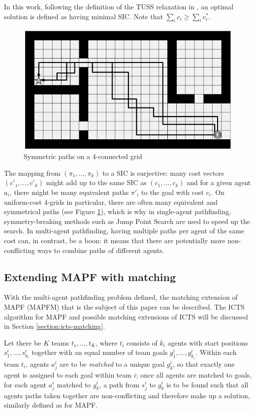 \documentclass[english,10pt]{article}
\begin{document}
	In this work, following the definition of the TUSS relaxation in \cite{mulderij2020}, an optimal solution is defined as having minimal SIC. Note that $\sum_i c_i \geq \sum_i c^*_i$.
	\begin{figure}
		\vspace{-10pt}
		\centering
		\includegraphics[width=\linewidth]{img/symmetries}
		\caption{Symmetric paths on a 4-connected grid\cite{harabor2010}}
		\label{fig:symmetries}
	\end{figure}
	The mapping from $(\pi_1,\ldots,\pi_k)$ to a SIC is surjective: many cost vectors $(c'_1,\ldots,c'_k)$ might add up to the same SIC as $(c_1,\ldots,c_k)$ and for a given agent $a_i$, there might be many equivalent paths $\pi'_i$ to the goal with cost $c_i$. On uniform-cost 4-grids in particular, there are often many equivalent and symmetrical paths\cite{harabor2010} (see Figure \ref{fig:symmetries}), which is why in single-agent pathfinding, symmetry-breaking methods such as Jump Point Search\cite{harabor2011} are used to speed up the search. In multi-agent pathfinding, having multiple paths per agent of the same cost can, in contrast, be a boon: it means that there are potentially more non-conflicting ways to combine paths of different agents.
	
	\subsection{Extending MAPF with matching}
	With the multi-agent pathfinding problem defined, the matching extension of MAPF (MAPFM) that is the subject of this paper can be described. The ICTS algorithm for MAPF and possible matching extensions of ICTS will be discussed in Section \ref{section:icts-matching}.
	
	Let there be $K$ teams $t_1,\ldots, t_K$, where $t_i$ consists of $k_i$ agents with start positions $s_1^i,\ldots,s_{k_i}^i$ together with an equal number of team goals $g_1^i,\ldots,g_{k_i}^i$. Within each team $t_i$, agents $a_j^i$ are to be \textit{matched} to a unique goal $g_k^i$, so that exactly one agent is assigned to each goal within team $i$; once all agents are matched to goals, for each agent $a_j^i$ matched to $g_k^i$, a path from $s_j^i$ to $g_k^i$ is to be found such that all agents paths taken together are non-conflicting and therefore make up a solution, similarly defined as for MAPF.
	
\end{document}
